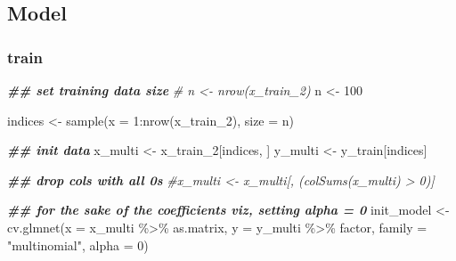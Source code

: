 \documentclass[
]{book}
\newenvironment{Shaded}{\begin{snugshade}}{\end{snugshade}}
\newcommand{\AttributeTok}[1]{\textcolor[rgb]{0.77,0.63,0.00}{#1}}
\newcommand{\CommentTok}[1]{\textcolor[rgb]{0.56,0.35,0.01}{\textit{#1}}}
\newcommand{\DecValTok}[1]{\textcolor[rgb]{0.00,0.00,0.81}{#1}}
\newcommand{\DocumentationTok}[1]{\textcolor[rgb]{0.56,0.35,0.01}{\textbf{\textit{#1}}}}
\newcommand{\FunctionTok}[1]{\textcolor[rgb]{0.00,0.00,0.00}{#1}}
\newcommand{\NormalTok}[1]{#1}
\newcommand{\OtherTok}[1]{\textcolor[rgb]{0.56,0.35,0.01}{#1}}
\newcommand{\SpecialCharTok}[1]{\textcolor[rgb]{0.00,0.00,0.00}{#1}}
\newcommand{\StringTok}[1]{\textcolor[rgb]{0.31,0.60,0.02}{#1}}
\begin{document}
\hypertarget{model-1}{%
\subsection{Model}\label{model-1}}

\hypertarget{train}{%
\subsubsection{train}\label{train}}

\begin{Shaded}
\begin{Highlighting}[]
\DocumentationTok{\#\# set training data size}
\CommentTok{\# n \textless{}{-} nrow(x\_train\_2)}
\NormalTok{n }\OtherTok{\textless{}{-}} \DecValTok{100}

\NormalTok{indices }\OtherTok{\textless{}{-}} \FunctionTok{sample}\NormalTok{(}\AttributeTok{x =} \DecValTok{1}\SpecialCharTok{:}\FunctionTok{nrow}\NormalTok{(x\_train\_2),}
                  \AttributeTok{size =}\NormalTok{ n)}

\DocumentationTok{\#\# init data}
\NormalTok{x\_multi }\OtherTok{\textless{}{-}}\NormalTok{ x\_train\_2[indices, ]}
\NormalTok{y\_multi }\OtherTok{\textless{}{-}}\NormalTok{ y\_train[indices]}

\DocumentationTok{\#\# drop cols with all 0s}
\CommentTok{\#x\_multi \textless{}{-} x\_multi[, (colSums(x\_multi) \textgreater{} 0)]}
\end{Highlighting}
\end{Shaded}

\begin{Shaded}
\begin{Highlighting}[]
\DocumentationTok{\#\# for the sake of the coefficients viz, setting alpha = 0}
\NormalTok{init\_model }\OtherTok{\textless{}{-}} \FunctionTok{cv.glmnet}\NormalTok{(}\AttributeTok{x =}\NormalTok{ x\_multi }\SpecialCharTok{\%\textgreater{}\%}\NormalTok{ as.matrix,}
                        \AttributeTok{y =}\NormalTok{ y\_multi }\SpecialCharTok{\%\textgreater{}\%}\NormalTok{ factor,}
                        \AttributeTok{family =} \StringTok{"multinomial"}\NormalTok{,}
                        \AttributeTok{alpha =} \DecValTok{0}\NormalTok{)}
\end{Highlighting}
\end{Shaded}
\end{document}
